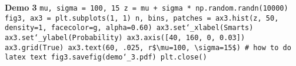 \textbf{Demo 3}\newline
\texttt{mu, sigma = 100, 15\newline
z = mu + sigma * np.random.randn(10000)\newline
fig3, ax3 = plt.subplots(1, 1)\newline
n, bins, patches = ax3.hist(z, 50, density=1, facecolor=\textquotesingle g\textquotesingle, alpha=0.60)\newline
ax3.set\char`_xlabel(\textquotesingle Smarts\textquotesingle)\newline
ax3.set\char`_ylabel(\textquotesingle Probability\textquotesingle)\newline
ax3.axis([40, 160, 0, 0.03])\newline
ax3.grid(True)\newline
ax3.text(60, .025, r\textquotesingle\$\textbackslash mu=100, \textbackslash sigma=15\$\textquotesingle) \# how to do latex text\newline
fig3.savefig(\textquotesingle demo\char`_3.pdf\textquotesingle)\newline
plt.close()}